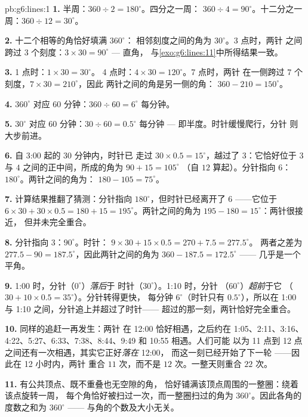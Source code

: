 \begin{solution}{pb:g6:lines:1}
\textbf{1.} 半周：$360 \div 2 = 180^\circ$。四分之一周：
$360 \div 4 = 90^\circ$。十二分之一周：$360 \div 12 = 30^\circ$。

\textbf{2.} 十二个相等的角恰好填满 $360^\circ$：
相邻刻度之间的角为 $30^\circ$。3 点时，两针
之间跨过 $3$ 个刻度：$3 \times 30 = 90^\circ$ --- 直角，
与\cref{exo:g6:lines:11}中所得结果一致。

\textbf{3.} 1 点时：$1 \times 30 = 30^\circ$。
4 点时：$4 \times 30 = 120^\circ$。7 点时，两针
在一侧跨过 $7$ 个刻度，$7 \times 30 = 210^\circ$，因此
两针之间的角是另一侧的角：
$360 - 210 = 150^\circ$。

\textbf{4.} $360^\circ$ 对应 $60$ 分钟：$360 \div 60 =
6^\circ$ 每分钟。

\textbf{5.} $30^\circ$ 对应 $60$ 分钟：$30 \div 60 = 0.5^\circ$
每分钟 --- 即半度。时针缓慢爬行，分针
则大步前进。

\textbf{6.} 自 3:00 起的 $30$ 分钟内，时针已
走过 $30 \times 0.5 = 15^\circ$，越过了 $3$：它恰好位于
$3$ 与 $4$ 之间的正中间，所成的角为 $90 + 15 = 105^\circ$
（自 $12$ 算起）。分针指向 $6$：
$180^\circ$。两针之间的角为：
$180 - 105 = 75^\circ$。

\textbf{7.} 计算结果推翻了猜测：分针指向
$180^\circ$，但时针已经离开了 $6$ ——它位于
$6 \times 30 + 30 \times 0.5 = 180 + 15 = 195^\circ$。两针之间的角为
$195 - 180 = 15^\circ$：两针很接近，
但并未完全重合。

\textbf{8.} 分针指向 $3$：$90^\circ$。时针：
$9 \times 30 + 15 \times 0.5 = 270 + 7.5 = 277.5^\circ$。
两者之差为 $277.5 - 90 = 187.5^\circ$，因此两针之间的角为
$360 - 187.5 = 172.5^\circ$ ——
几乎是一个平角。

\textbf{9.} 1:00 时，分针（$0^\circ$）\emph{落后}于
时针（$30^\circ$）。1:10 时，分针
（$60^\circ$）\emph{超前}于它
（$30 + 10 \times 0.5 = 35^\circ$）。分针转得更快，
每分钟 $6^\circ$（时针只有 $0.5^\circ$），所以在 1:00 与
1:10 之间，分针追上并超过了时针——
超过的那一刻，两针恰好完全重合。

\textbf{10.} 同样的追赶一再发生：两针
在 12:00 恰好相遇，之后约在 1:05、2:11、3:16、
4:22、5:27、6:33、7:38、8:44、9:49 和 10:55 相遇。人们可能
以为 11 点到 12 点之间还有一次相遇，其实它正好\emph{落在} 12:00，
而这一刻已经开始了下一轮 ——因此在 12 小时内，两针
重合 $11$ 次，而不是 $12$ 次。一整天则重合 $22$ 次。

\textbf{11.} 有公共顶点、既不重叠也无空隙的角，
恰好铺满该顶点周围的一整圈：绕着该点旋转一周，
每个角恰好被扫过一次，而一整圈扫过的角为
$360^\circ$。因此各角的度数之和为 $360^\circ$ ——
与角的个数及大小无关。


\end{solution}
